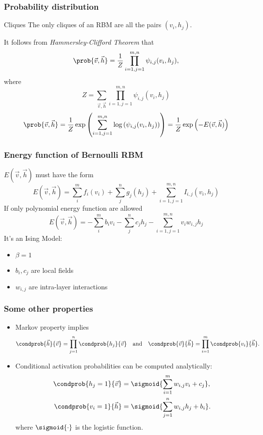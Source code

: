 \begin{frame}
  \frametitle{Probability distribution}
    \begin{alertblock}{Cliques}
      The only cliques of an RBM are all the pairs \((v_i,h_j)\).
    \end{alertblock}
    It follows from \emph{Hammersley-Clifford Theorem}\cite{fischer2012introduction} that 
    \[\prob{\vec{v}, \vec{h}} = \frac{1}{Z} \prod_{i=1,j=1}^{m,n} \psi_{i,j}(v_i, h_j),\]
    where
    \[Z = \sum_{\vec{v}, \vec{h}}\prod_{i=1,j=1}^{m,n} \psi_{i,j}(v_i, h_j)\]
    \pause
     \[
      \prob{\vec{v}, \vec{h}} 
      = \frac{1}{Z} \exp\left(\sum_{i=1,j=1}^{m,n}\log\left(\psi_{i,j}(v_i, h_j)\right)\right)
      = \frac{1}{Z} \exp\left(-E(\vec{v}, \vec{h})\right)
    \]
\end{frame}

\begin{frame}
  \frametitle{Energy function of Bernoulli RBM}
  \(E(\vec{v}, \vec{h})\) must have the form
  \[
    E(\vec{v}, \vec{h}) = \sum_{i}^m f_i{(v_i)} + \sum_{j}^n g_j{(h_j)} +
    \sum_{i=1,j=1}^{m,n} I_{i,j}{(v_i,h_j)}
  \]
  If only polynomial energy function are allowed
  \[
    E(\vec{v}, \vec{h}) = -\sum_{i}^m b_i v_i - \sum_{j}^n c_j h_j -
      \sum_{i=1,j=1}^{m,n} v_i w_{i,j} h_j
  \]
  It's an \alert{Ising Model}:
  \begin{itemize}
    \item \(\beta = 1\)
    \item \(b_i, c_j\) are local fields
    \item \(w_{i,j}\) are intra-layer interactions
  \end{itemize}
\end{frame}

\begin{frame}
  \frametitle{Some other properties}
  \begin{itemize}
    \item Markov property implies
      \[
        \condprob{\vec{h}}{\vec{v}} = \prod_{j=1}^n \condprob{h_j}{\vec{v}} \quad\text{and}\quad
        \condprob{\vec{v}}{\vec{h}} = \prod_{i=1}^m \condprob{v_i}{\vec{h}}.
      \]
    \item Conditional activation probabilities can be computed analytically:
      \begin{align*}
        \condprob{h_j=1}{\vec{v}} &= \sigmoid{\sum_{i=1}^m w_{i,j}v_i+c_j},\\
        \condprob{v_i=1}{\vec{h}} &= \sigmoid{\sum_{j=1}^n w_{i,j}h_j+b_i}.
      \end{align*}
      where \(\sigmoid{\cdot}\) is the \alert{logistic function}.
  \end{itemize}
\end{frame}

